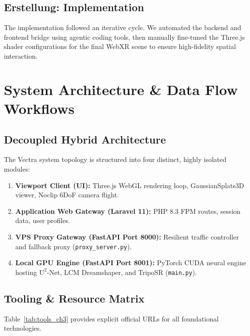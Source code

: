 \documentclass[11pt, a4paper]{article}
\begin{document}
\subsection{Erstellung: Implementation}
The implementation followed an iterative cycle. We automated the backend and frontend bridge using agentic coding tools, then manually fine-tuned the Three.js shader configurations for the final WebXR scene to ensure high-fidelity spatial interaction.


\section{System Architecture \& Data Flow Workflows}

\subsection{Decoupled Hybrid Architecture}
The Vectra system topology is structured into four distinct, highly isolated modules:
\begin{enumerate}
    \item \textbf{Viewport Client (UI):} Three.js WebGL rendering loop, GaussianSplats3D viewer, Noclip 6DoF camera flight.
    \item \textbf{Application Web Gateway (Laravel 11):} PHP 8.3 FPM routes, session data, user profiles.
    \item \textbf{VPS Proxy Gateway (FastAPI Port 8000):} Resilient traffic controller and fallback proxy (\texttt{proxy_server.py}).
    \item \textbf{Local GPU Engine (FastAPI Port 8001):} PyTorch CUDA neural engine hosting $\text{U}^2$-Net, LCM Dreamshaper, and TripoSR (\texttt{main.py}).
\end{enumerate}

\subsection{Tooling \& Resource Matrix}
Table~\ref{tab:tools_ch3} provides explicit official URLs for all foundational technologies.
\end{document}
